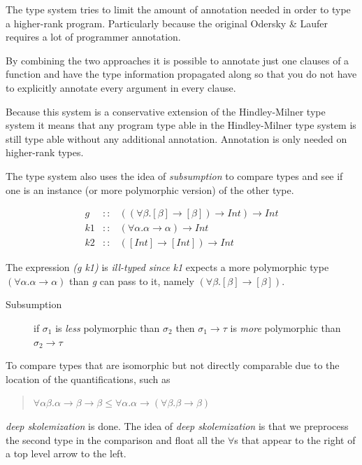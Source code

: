 \documentclass[twoside, titlepage, openright, a4paper]{book}
\renewcommand{\leq}{\leqslant}
\begin{document}
The type system tries to limit the amount of annotation needed in order to type a higher-rank program. Particularly because the original Odersky \& Laufer\cite{odesky} requires a lot of programmer annotation.

By combining the two approaches it is possible to annotate just one clauses of a function and have the type information propagated along so that you do not have to explicitly annotate every argument in every clause.

Because this system is a conservative extension of the Hindley-Milner type system it means that any program type able in the Hindley-Milner type system is still type able without any additional annotation. Annotation is only needed on higher-rank types.

The type system also uses the idea of \textit{subsumption} to compare types and see if one is an instance (or more polymorphic version) of the other type. 

\begin{eqnarray*}
g  &::& ((\forall\beta.[\beta] \rightarrow [\beta]) \rightarrow Int) \rightarrow Int \\
k1 &::& (\forall\alpha. \alpha \rightarrow \alpha) \rightarrow Int\\
k2 &::& ([Int] \rightarrow [Int]) \rightarrow Int
\end{eqnarray*}

The expression \textit{(g k1)} is \textit{ill-typed since} \textit{k1} expects a more polymorphic type $(\forall\alpha. \alpha \rightarrow \alpha)$ than \emph{g} can pass to it, namely $(\forall\beta.[\beta] \rightarrow [\beta])$. 

\begin{description}
\item[Subsumption] if $\sigma_1$ is \textit{less} polymorphic than $\sigma_2$ then $\sigma_1 \rightarrow \tau$ is \textit{more} polymorphic than $\sigma_2 \rightarrow \tau$
\end{description}

To compare types that are isomorphic but not directly comparable due to the location of the quantifications, such as
\begin{quotation}
$\forall\alpha\beta.\alpha\rightarrow\beta\rightarrow\beta\leq\forall\alpha.\alpha\rightarrow(\forall\beta.\beta\rightarrow\beta)$
\end{quotation}

\textit{deep skolemization} is done. The idea of \textit{deep skolemization} is that we preprocess the second type in the comparison and float all the $\forall$s that appear to the right of a top level arrow to the left.
\end{document}
